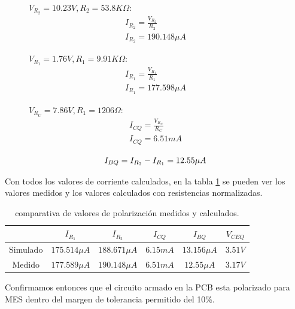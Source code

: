     \begin{figure}[!ht]
      \centering
      \begin{minipage}[t]{0.33\textwidth}
        $V_{R_2} = 10.23V, R_2 = 53.8K\Omega$:
        \begin{gather*}
          I_{R_2} = \frac{V_{R_2}}{R_2}\\[6pt]
          I_{R_2} = 190.148 \mu A
        \end{gather*}
      \end{minipage}
      \begin{minipage}[t]{0.32\textwidth}
        $V_{R_1} = 1.76V, R_1 = 9.91 K\Omega$:
        \begin{gather*}
          I_{R_1} = \frac{V_{R_1}}{R_1}\\[6pt]
          I_{R_1} = 177.598 \mu A
        \end{gather*}
      \end{minipage}
      \begin{minipage}[t]{0.33\textwidth}
        $V_{R_C} = 7.86V, R_1 = 1206\Omega$:
        \begin{gather*}
          I_{CQ} = \frac{V_{R_C}}{R_C}\\[6pt]
          I_{CQ} =  6.51 mA
        \end{gather*}
      \end{minipage}
    \end{figure}
    \begin{equation*}
      I_{BQ} = I_{R_2} - I_{R_1} = 12.55 \mu A\\[6pt]
    \end{equation*}

    Con todos los valores de corriente calculados, en la tabla \ref{tab:comparativa_real-calc} se pueden ver los valores
    medidos y los valores calculados con resistencias normalizadas.
    \begin{table}[!ht]
      \centering
      \begin{tabular}{|c|c|c|c|c|c|}
        \hline
                  & $I_{R_1}$       & $I_{R_2}$       & $I_{CQ}$  & $I_{BQ}$        & $V_{CEQ}$ \\ \hline
        Simulado  & $175.514 \mu A$ & $188.671 \mu A$ & $6.15 mA$ & $13.156 \mu A$  & $3.51V$   \\ \hline
        Medido    & $177.589 \mu A$ & $190.148 \mu A$ & $6.51 mA$ & $12.55 \mu A$   & $3.17V$   \\ \hline
      \end{tabular}
      \caption{comparativa de valores de polarización medidos y calculados.}
      \label{tab:comparativa_real-calc}
    \end{table}
    Confirmamos entonces que el circuito armado en la PCB esta polarizado para MES dentro del margen de tolerancia
    permitido del 10\%.
